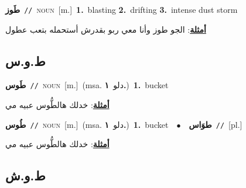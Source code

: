 \documentclass[10pt,a4paper,twoside]{article} %
\begin{document}
\begin{multicols}{2}
{\setlength\topsep{0pt}\textbf{\foreignlanguage{arabic}{طَوز}}\ {\color{gray}\texttt{//}\color{black}}\ \textsc{noun}\ [m.]\ \textbf{1.}~blasting  \textbf{2.}~drifting  \textbf{3.}~intense dust storm\  \begin{flushright}\color{gray}\foreignlanguage{arabic}{\textbf{\underline{\foreignlanguage{arabic}{أمثلة}}}: الجو طوز وأنا معي ربو بقدرش أستحمله بتعب عطول}\end{flushright}\color{black}} \vspace{2mm}

\vspace{-3mm}
\subsection*{\color{blue}\foreignlanguage{arabic}{ط.و.س}\color{blue}{}} 

{\setlength\topsep{0pt}\textbf{\foreignlanguage{arabic}{طَوس}}\ {\color{gray}\texttt{//}\color{black}}\ \textsc{noun}\ [m.]\ \color{gray}(msa. \foreignlanguage{arabic}{دلو}~\foreignlanguage{arabic}{\textbf{١.}})\color{black}\ \textbf{1.}~bucket\  \begin{flushright}\color{gray}\foreignlanguage{arabic}{\textbf{\underline{\foreignlanguage{arabic}{أمثلة}}}: خدلك هالطُّوس عبيه مي}\end{flushright}\color{black}} \vspace{2mm}

{\setlength\topsep{0pt}\textbf{\foreignlanguage{arabic}{طُوس}}\ {\color{gray}\texttt{//}\color{black}}\ \textsc{noun}\ [m.]\ \color{gray}(msa. \foreignlanguage{arabic}{دلو}~\foreignlanguage{arabic}{\textbf{١.}})\color{black}\ \textbf{1.}~bucket\ \ $\bullet$\ \ \setlength\topsep{0pt}\textbf{\foreignlanguage{arabic}{طوَاس}}\ {\color{gray}\texttt{//}\color{black}}\ [pl.]\  \begin{flushright}\color{gray}\foreignlanguage{arabic}{\textbf{\underline{\foreignlanguage{arabic}{أمثلة}}}: خدلك هالطُّوس عبيه مي}\end{flushright}\color{black}} \vspace{2mm}

\vspace{-3mm}
\subsection*{\color{blue}\foreignlanguage{arabic}{ط.و.ش}\color{blue}{}} 


\end{multicols}
\end{document}
